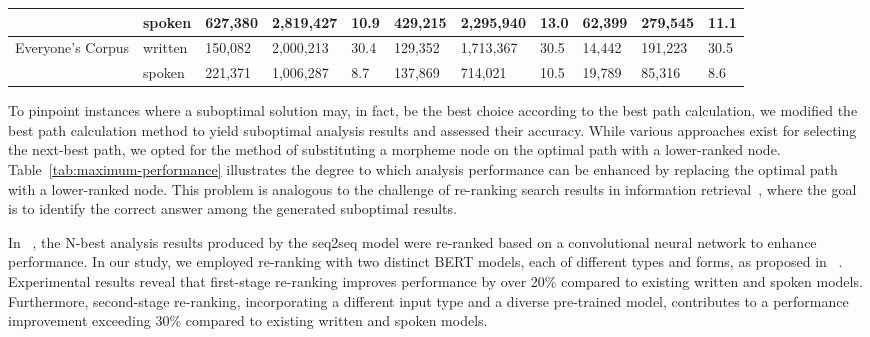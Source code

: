 \documentclass[AMS,STIX2COL]{WileyNJD-v2}
\begin{document}
\begin{table}[h]
\begin{tabular}{m{20mm}m{14mm}m{10mm}m{12mm}m{10mm}m{10mm}m{12mm}m{10mm}m{10mm}m{12mm}m{10mm}}
            ~                                  & spoken                 & 627,380   & 2,819,427  & 10.9                & 429,215   & 2,295,940  & 13.0                & 62,399    & 279,545 & 11.1                \\
            \midrule
            \multirow{2}{*}{Everyone's Corpus} & written                & 150,082   & 2,000,213  & 30.4                & 129,352   & 1,713,367  & 30.5                & 14,442    & 191,223 & 30.5                \\
            ~                                  & spoken                 & 221,371   & 1,006,287  & 8.7                 & 137,869   & 714,021    & 10.5                & 19,789    & 85,316  & 8.6                 \\
            \bottomrule
        \end{tabular}
    \end{table}

    To pinpoint instances where a suboptimal solution may, in fact, be the best choice according to the best path calculation, we modified the best path calculation method to yield suboptimal analysis results and assessed their accuracy.
    While various approaches exist for selecting the next-best path, we opted for the method of substituting a morpheme node on the optimal path with a lower-ranked node.
    Table~\ref{tab:maximum-performance} illustrates the degree to which analysis performance can be enhanced by replacing the optimal path with a lower-ranked node.
    This problem is analogous to the challenge of re-ranking search results in information retrieval~\cite{BaeYJ2021}, where the goal is to identify the correct answer among the generated suboptimal results.

    In ~\cite{ChoiYS2018}, the N-best analysis results produced by the seq2seq model were re-ranked based on a convolutional neural network to enhance performance.
    In our study, we employed re-ranking with two distinct BERT models, each of different types and forms, as proposed in ~\cite{Nogueira2019}.
    Experimental results reveal that first-stage re-ranking improves performance by over 20\% compared to existing written and spoken models.
    Furthermore, second-stage re-ranking, incorporating a different input type and a diverse pre-trained model, contributes to a performance improvement exceeding 30\% compared to existing written and spoken models.
\end{document}
